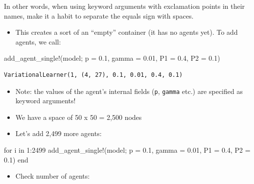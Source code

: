 \documentclass[
  letterpaper,
  DIV=11,
  numbers=noendperiod]{scrartcl}
\newenvironment{Shaded}{\begin{snugshade}}{\end{snugshade}}
\newcommand{\ControlFlowTok}[1]{\textcolor[rgb]{0.00,0.23,0.31}{#1}}
\newcommand{\FloatTok}[1]{\textcolor[rgb]{0.68,0.00,0.00}{#1}}
\newcommand{\FunctionTok}[1]{\textcolor[rgb]{0.28,0.35,0.67}{#1}}
\newcommand{\KeywordTok}[1]{\textcolor[rgb]{0.00,0.23,0.31}{#1}}
\newcommand{\NormalTok}[1]{\textcolor[rgb]{0.00,0.23,0.31}{#1}}
\newcommand{\OperatorTok}[1]{\textcolor[rgb]{0.37,0.37,0.37}{#1}}
\providecommand{\tightlist}{%
  \setlength{\itemsep}{0pt}\setlength{\parskip}{0pt}}\usepackage{longtable,booktabs,array}
\begin{document}
In other words, when using keyword arguments with exclamation points in
their names, make it a habit to separate the equals sign with spaces.

\begin{itemize}
\tightlist
\item
  This creates a sort of an ``empty'' container (it has no agents yet).
  To add agents, we call:
\end{itemize}

\begin{Shaded}
\begin{Highlighting}[]
\FunctionTok{add\_agent\_single!}\NormalTok{(model; p }\OperatorTok{=} \FloatTok{0.1}\NormalTok{, gamma }\OperatorTok{=} \FloatTok{0.01}\NormalTok{, }
\NormalTok{                  P1 }\OperatorTok{=} \FloatTok{0.4}\NormalTok{, P2 }\OperatorTok{=} \FloatTok{0.1}\NormalTok{)}
\end{Highlighting}
\end{Shaded}

\begin{verbatim}
VariationalLearner(1, (4, 27), 0.1, 0.01, 0.4, 0.1)
\end{verbatim}

\begin{itemize}
\tightlist
\item
  Note: the values of the agent's internal fields (\texttt{p},
  \texttt{gamma} etc.) are specified as keyword arguments!
\end{itemize}

\begin{itemize}
\tightlist
\item
  We have a space of 50 x 50 = 2,500 nodes
\item
  Let's add 2,499 more agents:
\end{itemize}

\begin{Shaded}
\begin{Highlighting}[]
\ControlFlowTok{for}\NormalTok{ i }\KeywordTok{in} \FloatTok{1}\OperatorTok{:}\FloatTok{2499}
  \FunctionTok{add\_agent\_single!}\NormalTok{(model; p }\OperatorTok{=} \FloatTok{0.1}\NormalTok{, gamma }\OperatorTok{=} \FloatTok{0.01}\NormalTok{, }
\NormalTok{                    P1 }\OperatorTok{=} \FloatTok{0.4}\NormalTok{, P2 }\OperatorTok{=} \FloatTok{0.1}\NormalTok{)}
\ControlFlowTok{end}
\end{Highlighting}
\end{Shaded}

\begin{itemize}
\tightlist
\item
  Check number of agents:
\end{itemize}
\end{document}
